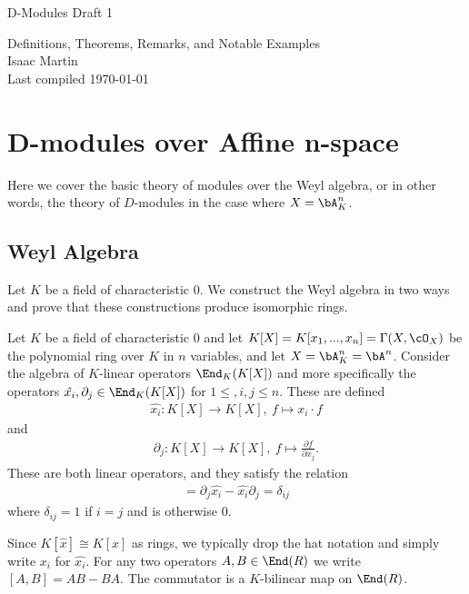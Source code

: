 


\begin{center}
	\Large
	\begin{LARGE}
		D-Modules Draft 1 \\
	\end{LARGE}
	Definitions, Theorems, Remarks, and Notable Examples \\
	Isaac Martin \\
    Last compiled \today
\end{center}
\normalsize
\vspace{-2mm}
\hru

\tableofcontents
\newpage
\section{D-modules over Affine n-space}
Here we cover the basic theory of modules over the Weyl algebra, or in other words, the theory of $D$-modules in the case where $X = \bA^n_K$.

\subsection{Weyl Algebra}
Let $K$ be a field of characteristic $0$. We construct the Weyl algebra in two ways and prove that these constructions produce isomorphic rings.

\begin{defn}\label{defn:Weyl-algebra-construction-1}
	Let $K$ be a field of characteristic $0$ and let $K[X] = K[x_1,...,x_n] = \Gamma(X,\cO_X)$ be the polynomial ring over $K$ in $n$ variables, and let $X = \bA^n_K = \bA^n$. Consider the algebra of $K$-linear operators $\End_K(K[X])$ and more specifically the operators $\hat{x_i}, \partial_j \in \End_K(K[X])$ for $1\leq, i,j \leq n$. These are defined
	\begin{align*}
		\hat{x_i}: K[X]\to K[X], ~ f \mapsto x_i \cdot f
	\end{align*}
	and 
	\begin{align*}
		\partial_j:K[X]\to K[X], ~ f\mapsto \frac{\partial f}{\partial x_j}.
	\end{align*}
	These are both linear operators, and they satisfy the relation
	\begin{align*}
		[\partial_j, \hat{x_i}] = \partial_j \hat{x_i} - \hat{x_i}\partial_j = \delta_{ij}
	\end{align*}
	where $\delta_{ij} = 1$ if $i = j$ and is otherwise 0. 
\end{defn}
Since $K[\hat{x}] \cong K[x]$ as rings, we typically drop the hat notation and simply write $x_i$ for $\hat{x_i}$. For any two operators $A,B \in \End(R)$ we write  $[A,B] = AB - BA$. The commutator is a $K$-bilinear map on $\End(R)$.

